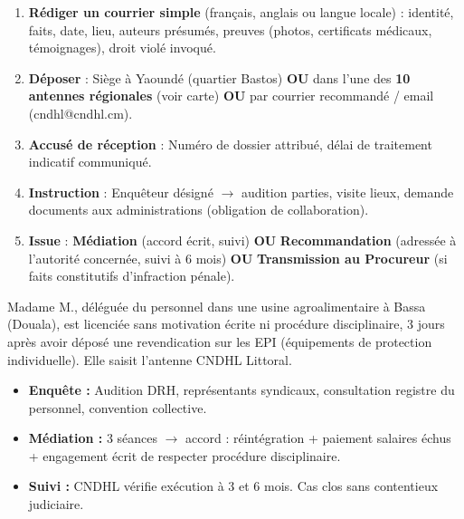 \documentclass[11pt]{article}
\begin{document}
\begin{methode}
\begin{enumerate}
  \item \textbf{Rédiger un courrier simple} (français, anglais ou langue locale) : identité, faits, date, lieu, auteurs présumés, preuves (photos, certificats médicaux, témoignages), droit violé invoqué.
  \item \textbf{Déposer} : Siège à Yaoundé (quartier Bastos) \textbf{OU} dans l'une des \textbf{10 antennes régionales} (voir carte) \textbf{OU} par courrier recommandé / email (cndhl@cndhl.cm).
  \item \textbf{Accusé de réception} : Numéro de dossier attribué, délai de traitement indicatif communiqué.
  \item \textbf{Instruction} : Enquêteur désigné $\to$ audition parties, visite lieux, demande documents aux administrations (obligation de collaboration).
  \item \textbf{Issue} : \textbf{Médiation} (accord écrit, suivi) \textbf{OU} \textbf{Recommandation} (adressée à l'autorité concernée, suivi à 6 mois) \textbf{OU} \textbf{Transmission au Procureur} (si faits constitutifs d'infraction pénale).
\end{enumerate}
\end{methode}

\begin{exemplebox}
Madame M., déléguée du personnel dans une usine agroalimentaire à Bassa (Douala), est licenciée sans motivation écrite ni procédure disciplinaire, 3 jours après avoir déposé une revendication sur les EPI (équipements de protection individuelle). Elle saisit l'antenne CNDHL Littoral.
\begin{itemize}
  \item \textbf{Enquête :} Audition DRH, représentants syndicaux, consultation registre du personnel, convention collective.
  \item \textbf{Médiation :} 3 séances $\to$ accord : réintégration + paiement salaires échus + engagement écrit de respecter procédure disciplinaire.
  \item \textbf{Suivi :} CNDHL vérifie exécution à 3 et 6 mois. Cas clos sans contentieux judiciaire.
\end{itemize}
\end{exemplebox}
\end{document}

